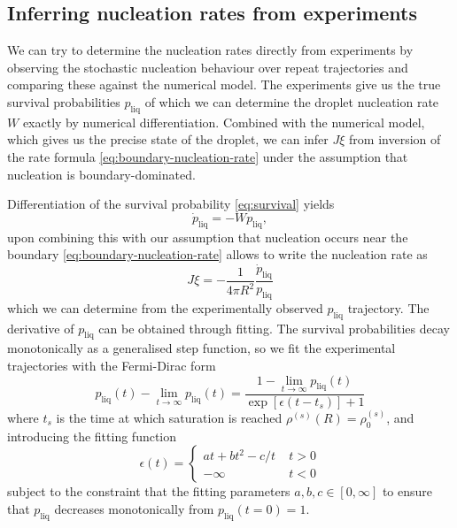 \documentclass[11pt,twoside]{report}
\begin{document}
\subsection{Inferring nucleation rates from experiments}

We can try to determine the nucleation rates directly from experiments by observing the stochastic nucleation behaviour over repeat trajectories and comparing these against the numerical model.
The experiments give us the true survival probabilities $p_\mathrm{liq}$ of which we can determine the droplet nucleation rate $W$ exactly by numerical differentiation.
Combined with the numerical model, which gives us the precise state of the droplet, we can infer $J\xi$ from inversion of the rate formula \eqref{eq:boundary-nucleation-rate} under the assumption that nucleation is boundary-dominated.

Differentiation of the survival probability \eqref{eq:survival} yields
\begin{equation}
  \dot{p}_\mathrm{liq}
  =
  - W p_\mathrm{liq},
\end{equation}
upon combining this with our assumption that nucleation occurs near the boundary \eqref{eq:boundary-nucleation-rate} allows to write the nucleation rate as
\begin{equation}
  J\xi
  =
  - \frac{1}{4\pi R^2} \frac{\dot{p}_\mathrm{liq}}{p_\mathrm{liq}}
\end{equation}
which we can determine from the experimentally observed $p_\mathrm{liq}$ trajectory.
The derivative of $p_\mathrm{liq}$ can be obtained through fitting.
The survival probabilities decay monotonically as a generalised step function, so we fit the experimental trajectories with the Fermi-Dirac form
\begin{equation}
  p_\mathrm{liq}(t) - \lim_{t \to \infty} p_\mathrm{liq}(t)
  =
  \frac{1 - \lim_{t \to \infty} p_\mathrm{liq}(t)}{\exp{\left[\epsilon(t - t_s)\right]} + 1}
\end{equation}
where $t_s$ is the time at which saturation is reached $\rho^{(s)}(R) = \rho^{(s)}_0$, and introducing the fitting function
\begin{equation*}
  \epsilon(t)
  =
  \begin{cases}
    at + bt^2 - c / t & \; t > 0 \\
    - \infty & \; t < 0
  \end{cases}
\end{equation*}
subject to the constraint that the fitting parameters $a, b, c \in [0, \infty]$ to ensure that $p_\mathrm{liq}$ decreases monotonically from $p_\mathrm{liq}(t=0)=1$.
\end{document}
